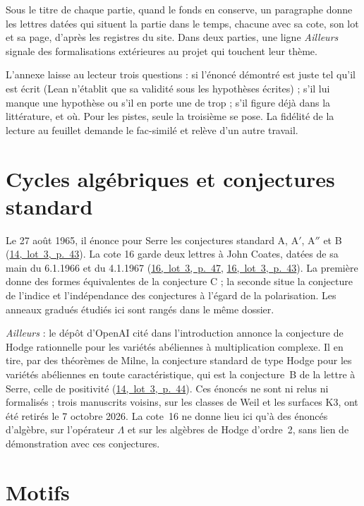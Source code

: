 \documentclass[11pt]{article}
\newcommand{\lot}[3]{\mbox{\href{https://grothendieck.commutator.io/\##1/#2/p#3}{#1, lot #2, p.~#3}}}
\newcommand{\lettres}[1]{{\small #1\par}\medskip}
\newcommand{\ailleurs}[1]{{\small\textit{Ailleurs} : #1\par}\medskip}
\theoremstyle{plain}
\theoremstyle{definition}
\theoremstyle{plain}
\theoremstyle{definition}
\theoremstyle{remark}
\renewcommand{\_}{\bkunderscore\allowbreak}
\begin{document}
Sous le titre de chaque partie, quand le fonds en conserve, un paragraphe donne les lettres datées qui situent la partie dans le temps, chacune avec sa cote, son lot et sa page, d'après les registres du site. Dans deux parties, une ligne \textit{Ailleurs} signale des formalisations extérieures au projet qui touchent leur thème.

L'annexe laisse au lecteur trois questions : si l'énoncé démontré est juste tel qu'il est écrit (Lean n'établit que sa validité sous les hypothèses écrites) ; s'il lui manque une hypothèse ou s'il en porte une de trop ; s'il figure déjà dans la littérature, et où. Pour les pistes, seule la troisième se pose. La fidélité de la lecture au feuillet demande le fac-similé et relève d'un autre travail.



\part{Cycles algébriques et conjectures standard}
\lettres{Le 27 août 1965, il énonce pour Serre les conjectures standard A, A$'$, A$''$ et B (\lot{14}{3}{43}). La cote 16 garde deux lettres à John Coates, datées de sa main du 6.1.1966 et du 4.1.1967 (\lot{16}{3}{47}, \lot{16}{3}{43}). La première donne des formes équivalentes de la conjecture C ; la seconde situe la conjecture de l'indice et l'indépendance des conjectures à l'égard de la polarisation. Les anneaux gradués étudiés ici sont rangés dans le même dossier.}
\ailleurs{le dépôt d'OpenAI cité dans l'introduction annonce la conjecture de Hodge rationnelle pour les variétés abéliennes à multiplication complexe. Il en tire, par des théorèmes de Milne, la conjecture standard de type Hodge pour les variétés abéliennes en toute caractéristique, qui est la conjecture~B de la lettre à Serre, celle de positivité (\lot{14}{3}{44}). Ces énoncés ne sont ni relus ni formalisés ; trois manuscrits voisins, sur les classes de Weil et les surfaces K3, ont été retirés le 7 octobre 2026. La cote~16 ne donne lieu ici qu'à des énoncés d'algèbre, sur l'opérateur $\Lambda$ et sur les algèbres de Hodge d'ordre~2, sans lien de démonstration avec ces conjectures.}





\part{Motifs}

\end{document}
